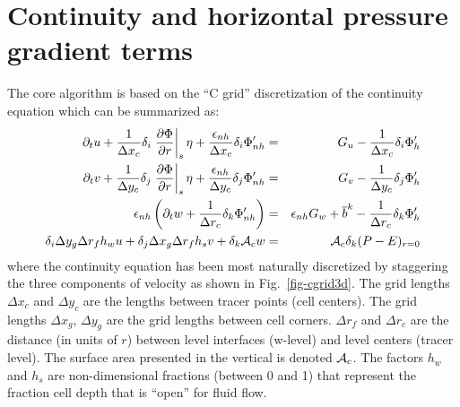 

\section{Continuity and horizontal pressure gradient terms}

The core algorithm is based on the ``C grid'' discretization of the
continuity equation which can be summarized as:
\begin{eqnarray}
\partial_t u + \frac{1}{\Delta x_c} \delta_i \left. \frac{ \partial \Phi}{\partial r}\right|_{s} \eta + \frac{\epsilon_{nh}}{\Delta x_c} \delta_i \Phi_{nh}' & = & G_u - \frac{1}{\Delta x_c} \delta_i \Phi_h' \label{eq:discrete-momu} \\
\partial_t v + \frac{1}{\Delta y_c} \delta_j \left. \frac{ \partial \Phi}{\partial r}\right|_{s} \eta + \frac{\epsilon_{nh}}{\Delta y_c} \delta_j \Phi_{nh}' & = & G_v - \frac{1}{\Delta y_c} \delta_j \Phi_h' \label{eq:discrete-momv} \\
\epsilon_{nh} \left( \partial_t w + \frac{1}{\Delta r_c} \delta_k \Phi_{nh}' \right) & = & \epsilon_{nh} G_w + \overline{b}^k - \frac{1}{\Delta r_c} \delta_k \Phi_{h}' \label{eq:discrete-momw} \\
\delta_i \Delta y_g \Delta r_f h_w u +
\delta_j \Delta x_g \Delta r_f h_s v +
\delta_k {\cal A}_c w & = & {\cal A}_c \delta_k (P-E)_{r=0}
\label{eq:discrete-continuity}
\end{eqnarray}
where the continuity equation has been most naturally discretized by
staggering the three components of velocity as shown in
Fig.~\ref{fig-cgrid3d}. The grid lengths $\Delta x_c$ and $\Delta y_c$
are the lengths between tracer points (cell centers). The grid lengths
$\Delta x_g$, $\Delta y_g$ are the grid lengths between cell
corners. $\Delta r_f$ and $\Delta r_c$ are the distance (in units of
$r$) between level interfaces (w-level) and level centers (tracer
level). The surface area presented in the vertical is denoted ${\cal
A}_c$.  The factors $h_w$ and $h_s$ are non-dimensional fractions
(between 0 and 1) that represent the fraction cell depth that is
``open'' for fluid flow.

